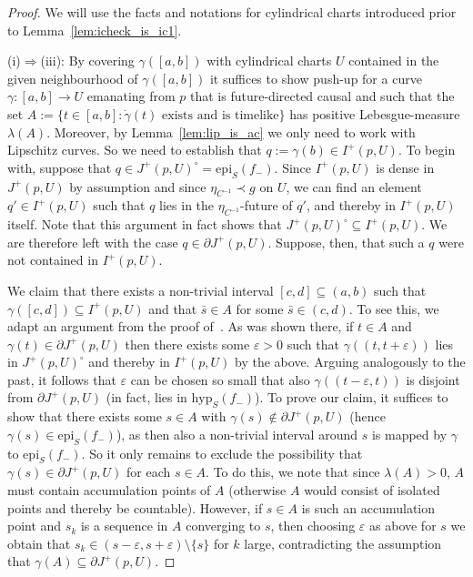 \documentclass[reqno]{amsart}
\numberwithin{equation}{section}
\theoremstyle{plain}
\theoremstyle{definition}
\theoremstyle{remark}
\newcommand\eps{\ensuremath{\varepsilon}}
\newcommand{\sse}{\subseteq}
\begin{document}
\begin{proof} We will use the facts and notations for cylindrical charts introduced prior to Lemma~\ref{lem:icheck_is_ic1}.

\noindent(i)$\Rightarrow$(iii): By covering $\gamma([a,b])$ with cylindrical charts $U$ contained in the given neighbourhood of 
$\gamma([a,b])$ it suffices to show push-up for a curve $\gamma \colon [a,b]\to U$ emanating from $p$ that is future-directed causal 
and such that the set $A:=\{t\in [a,b] : \dot\gamma(t) \text{ exists and is timelike} \}$ has positive Lebesgue-measure 
$\lambda(A)$. Moreover, by Lemma~\ref{lem:lip_is_ac} we only need to work with Lipschitz curves. So we need to establish that 
$q:=\gamma(b)\in I^+(p,U)$. To begin with, suppose that $q\in J^+(p,U)^\circ = \mathrm{epi}_S(f_-)$. Since $I^+(p,U)$ is 
dense in $J^+(p,U)$ by assumption and since $\eta_{C^{-1}}\prec g$ on $U$, we can find an element $q'\in I^+(p,U)$ such that $q$ lies in 
the $\eta_{C^{-1}}$-future of $q'$, and thereby in $I^+(p,U)$ itself. Note that this argument in fact shows that 
$J^+(p,U)^\circ \sse I^+(p,U)$. We are therefore left with the case $q\in \partial J^+(p,U)$. Suppose, then, that such a $q$ were not contained in $I^+(p,U)$. 

We claim that there exists a non-trivial interval $[c,d]\sse (a,b)$ such that $\gamma([c,d])\sse I^+(p,U)$ and that $\bar s\in A$ for some $\bar s\in (c,d)$. To see this, we adapt an 
argument from the proof of~\cite[Prop.\ 1.21]{CG:12}. As was shown there, 
if $t\in A$ and $\gamma(t)\in \partial J^+(p,U)$ then there exists some $\eps>0$ such that $\gamma((t,t+\eps))$ lies in $J^+(p,U)^\circ$ and thereby in $I^+(p,U)$ by the above. 
Arguing analogously to the past, it follows that $\eps$ can be chosen so small that
also $\gamma((t-\eps,t))$ is disjoint from $\partial J^+(p,U)$ (in fact, lies in $\mathrm{hyp}_S(f_-)$). To prove our claim, it suffices
to show that there exists some $s\in A$ with $\gamma(s)\not\in \partial J^+(p,U)$ (hence $\gamma(s)\in
\mathrm{epi}_S(f_-)$), as then
also a non-trivial interval around $s$ is mapped by $\gamma$ to $\mathrm{epi}_S(f_-)$.
So it only remains to exclude the possibility that $\gamma(s)\in \partial J^+(p,U)$ for each
$s\in A$. To do this, we note that since $\lambda(A)>0$, $A$ must contain
accumulation points of $A$ (otherwise $A$ would consist of isolated points and thereby be countable).
However, if $s\in A$ is such an accumulation point and $s_k$ is a sequence in $A$ converging
to $s$, then choosing $\eps$ as above for $s$ we obtain that $s_k\in (s-\eps,s+\eps)\setminus
\{s\}$ for $k$ large, contradicting the assumption that $\gamma(A)\sse \partial J^+(p,U)$.





\end{proof}
\end{document}
